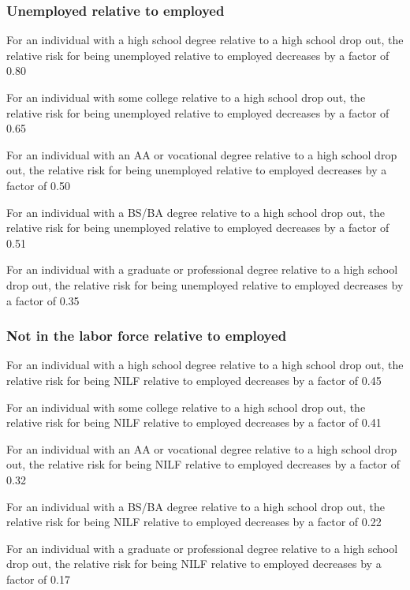 \documentclass[
]{book}
\begin{document}
\subsubsection{Unemployed relative to employed}\label{unemployed-relative-to-employed}

For an individual with a high school degree relative to a high school drop out, the relative risk for being unemployed relative to employed decreases by a factor of 0.80

For an individual with some college relative to a high school drop out, the relative risk for being unemployed relative to employed decreases by a factor of 0.65

For an individual with an AA or vocational degree relative to a high school drop out, the relative risk for being unemployed relative to employed decreases by a factor of 0.50

For an individual with a BS/BA degree relative to a high school drop out, the relative risk for being unemployed relative to employed decreases by a factor of 0.51

For an individual with a graduate or professional degree relative to a high school drop out, the relative risk for being unemployed relative to employed decreases by a factor of 0.35

\subsubsection{Not in the labor force relative to employed}\label{not-in-the-labor-force-relative-to-employed}

For an individual with a high school degree relative to a high school drop out, the relative risk for being NILF relative to employed decreases by a factor of 0.45

For an individual with some college relative to a high school drop out, the relative risk for being NILF relative to employed decreases by a factor of 0.41

For an individual with an AA or vocational degree relative to a high school drop out, the relative risk for being NILF relative to employed decreases by a factor of 0.32

For an individual with a BS/BA degree relative to a high school drop out, the relative risk for being NILF relative to employed decreases by a factor of 0.22

For an individual with a graduate or professional degree relative to a high school drop out, the relative risk for being NILF relative to employed decreases by a factor of 0.17
\end{document}
